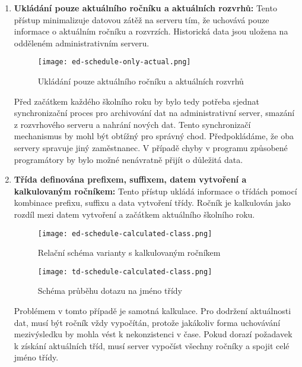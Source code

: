 \begin{enumerate}
    \item \textbf{Ukládání pouze aktuálního ročníku a aktuálních rozvrhů:} Tento přístup minimalizuje datovou zátěž na serveru tím, že uchovává pouze informace o aktuálním ročníku a rozvrzích. Historická data jsou uložena na odděleném administrativním serveru.

    \begin{figure}[H]
        \centering
        \texttt{[image: ed-schedule-only-actual.png]}
        \caption{Ukládání pouze aktuálního ročníku a aktuálních rozvrhů}
        \label{fig:ed-schedule-only-actual}
    \end{figure}
    
    Před začátkem každého školního roku by bylo tedy potřeba sjednat synchronizační proces pro archivování dat na administrativní server, smazání z rozvrhového serveru a nahrání nových dat. Tento synchronizačí mechanismus by mohl být obtížný pro správný chod. Předpokládáme, že oba servery spravuje jiný zaměstnanec. V případě chyby v programu způsobené programátory by bylo možné nenávratně přijít o důležitá data.

    \item \textbf{Třída definována prefixem, suffixem, datem vytvoření a kalkulovaným ročníkem:} Tento přístup ukládá informace o třídách pomocí kombinace prefixu, suffixu a data vytvoření třídy. Ročník je kalkulován jako rozdíl mezi datem vytvoření a začátkem aktuálního školního roku.

    \begin{figure}[H]
        \centering
        \texttt{[image: ed-schedule-calculated-class.png]}
        \caption{Relační schéma varianty s kalkulovaným ročníkem}
        \label{fig:ed-schedule-only-actual}
    \end{figure}

    \begin{figure}[H]
        \centering
        \texttt{[image: td-schedule-calculated-class.png]}
        \caption{Schéma průběhu dotazu na jméno třídy}
        \label{fig:td-schedule-calculated-class}
    \end{figure}
    
    Problémem v tomto případě je samotná kalkulace. Pro dodržení aktuálnosti dat, musí být ročník vždy vypočítán, protože jakákoliv forma uchovávání mezivýsledku by mohla vést k nekonzistenci v čase. Pokud dorazí požadavek k získání aktuálních tříd, musí server vypočíst všechny ročníky a spojit celé jméno třídy.


\end{enumerate}
